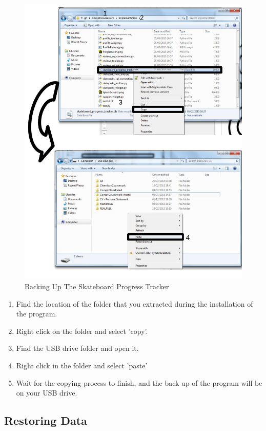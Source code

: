 \begin{figure}[H]
    \includegraphics[width=\textwidth]{./Manual/Images/BackUp.pdf}
    \caption{Backing Up The Skateboard Progress Tracker} \label{fig:BackUp}
\end{figure}

\begin{enumerate}
\item Find the location of the folder that you extracted during the installation of the program.
\item Right click on the folder and select 'copy'.
\item Find the USB drive folder and open it.
\item Right click in the folder and select 'paste' 
\item Wait for the copying process to finish, and the back up of the program will be on your USB drive.
\end{enumerate}

\subsection{Restoring Data}

